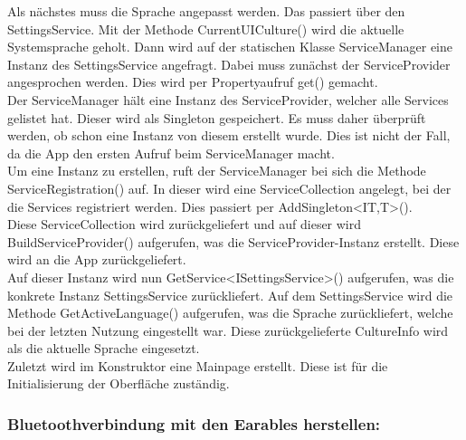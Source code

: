 \documentclass[a4paper,12pt]{article}
\begin{document}
Als nächstes muss die Sprache angepasst werden. Das passiert über den SettingsService.
Mit der Methode CurrentUICulture() wird die aktuelle Systemsprache geholt. Dann wird auf der statischen Klasse ServiceManager eine Instanz des SettingsService angefragt. Dabei muss zunächst der ServiceProvider angesprochen werden. Dies wird per Propertyaufruf get() gemacht.\\
Der ServiceManager hält eine Instanz des ServiceProvider, welcher alle Services gelistet hat. Dieser wird als Singleton gespeichert. Es muss daher überprüft werden, ob schon eine Instanz von diesem erstellt wurde. Dies ist nicht der Fall, da die App den ersten Aufruf beim ServiceManager macht.\\
Um eine Instanz zu erstellen, ruft der ServiceManager bei sich die Methode ServiceRegistration() auf. In dieser wird eine ServiceCollection angelegt, bei der die Services registriert werden. Dies passiert per AddSingleton<IT,T>(). \\
Diese ServiceCollection wird zurückgeliefert und auf dieser wird BuildServiceProvider() aufgerufen, was die ServiceProvider-Instanz erstellt.
Diese wird an die App zurückgeliefert.\\
Auf dieser Instanz wird nun GetService<ISettingsService>() aufgerufen, was die konkrete Instanz SettingsService zurückliefert.
Auf dem SettingsService wird die Methode GetActiveLanguage() aufgerufen, was die Sprache zurückliefert, welche bei der letzten Nutzung eingestellt war. 
Diese zurückgelieferte CultureInfo wird als die aktuelle Sprache eingesetzt.\\
Zuletzt wird im Konstruktor eine Mainpage erstellt. Diese ist für die Initialisierung der Oberfläche zuständig.\\


\newpage
\subsubsection{Bluetoothverbindung mit den Earables herstellen:}
\end{document}

